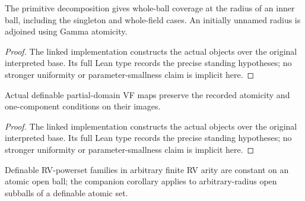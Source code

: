 \begin{corollary}

\label{s3-7}


\leanok

The primitive decomposition gives whole-ball coverage at the radius of an inner ball, including the singleton and whole-field cases. An initially unnamed radius is adjoined using Gamma atomicity.

\end{corollary}

\begin{proof}


\leanok

The linked implementation constructs the actual objects over the original interpreted base. Its full Lean type records the precise standing hypotheses; no stronger uniformity or parameter-smallness claim is implicit here.

\end{proof}

\begin{lemma}

\label{s3-8}


\leanok

Actual definable partial-domain VF maps preserve the recorded atomicity and one-component conditions on their images.

\end{lemma}

\begin{proof}


\leanok

The linked implementation constructs the actual objects over the original interpreted base. Its full Lean type records the precise standing hypotheses; no stronger uniformity or parameter-smallness claim is implicit here.

\end{proof}

\begin{lemma}

\label{s3-9}


\leanok

Definable RV-powerset families in arbitrary finite RV arity are constant on an atomic open ball; the companion corollary applies to arbitrary-radius open subballs of a definable atomic set.

\end{lemma}

